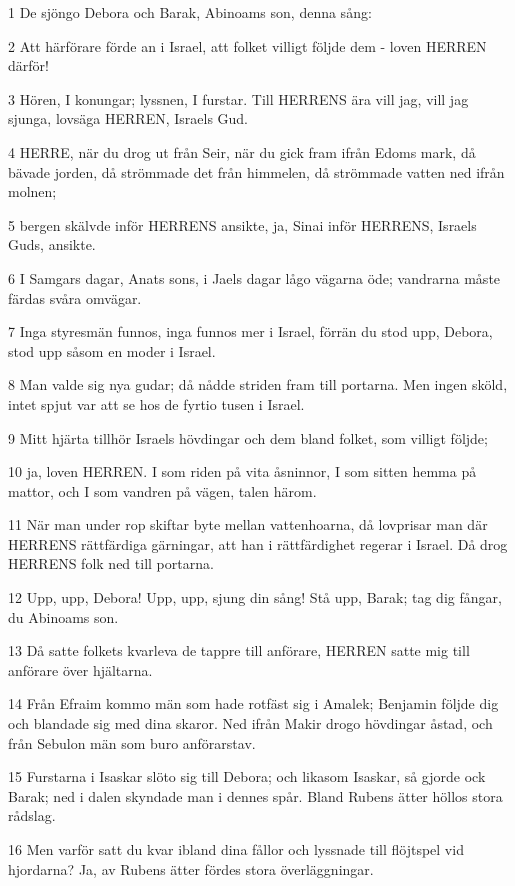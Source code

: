 \par 1 De sjöngo Debora och Barak, Abinoams son, denna sång:
\par 2 Att härförare förde an i Israel, att folket villigt följde dem - loven HERREN därför!
\par 3 Hören, I konungar; lyssnen, I furstar. Till HERRENS ära vill jag, vill jag sjunga, lovsäga HERREN, Israels Gud.
\par 4 HERRE, när du drog ut från Seir, när du gick fram ifrån Edoms mark, då bävade jorden, då strömmade det från himmelen, då strömmade vatten ned ifrån molnen;
\par 5 bergen skälvde inför HERRENS ansikte, ja, Sinai inför HERRENS, Israels Guds, ansikte.
\par 6 I Samgars dagar, Anats sons, i Jaels dagar lågo vägarna öde; vandrarna måste färdas svåra omvägar.
\par 7 Inga styresmän funnos, inga funnos mer i Israel, förrän du stod upp, Debora, stod upp såsom en moder i Israel.
\par 8 Man valde sig nya gudar; då nådde striden fram till portarna. Men ingen sköld, intet spjut var att se hos de fyrtio tusen i Israel.
\par 9 Mitt hjärta tillhör Israels hövdingar och dem bland folket, som villigt följde;
\par 10 ja, loven HERREN. I som riden på vita åsninnor, I som sitten hemma på mattor, och I som vandren på vägen, talen härom.
\par 11 När man under rop skiftar byte mellan vattenhoarna, då lovprisar man där HERRENS rättfärdiga gärningar, att han i rättfärdighet regerar i Israel. Då drog HERRENS folk ned till portarna.
\par 12 Upp, upp, Debora! Upp, upp, sjung din sång! Stå upp, Barak; tag dig fångar, du Abinoams son.
\par 13 Då satte folkets kvarleva de tappre till anförare, HERREN satte mig till anförare över hjältarna.
\par 14 Från Efraim kommo män som hade rotfäst sig i Amalek; Benjamin följde dig och blandade sig med dina skaror. Ned ifrån Makir drogo hövdingar åstad, och från Sebulon män som buro anförarstav.
\par 15 Furstarna i Isaskar slöto sig till Debora; och likasom Isaskar, så gjorde ock Barak; ned i dalen skyndade man i dennes spår. Bland Rubens ätter höllos stora rådslag.
\par 16 Men varför satt du kvar ibland dina fållor och lyssnade till flöjtspel vid hjordarna? Ja, av Rubens ätter fördes stora överläggningar.
